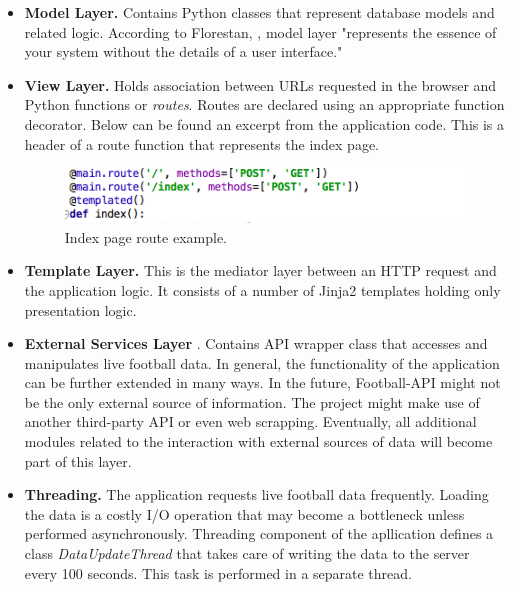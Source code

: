 \begin{itemize}
    \item \textbf{Model Layer.} Contains Python classes that represent database models and related logic. According to Florestan, \cite{article:goodArchitecture}, model layer "represents the essence of your system without the details of a user interface."
    \item \textbf{View Layer.} Holds association between URLs requested in the browser and Python functions or \emph{routes}. Routes are declared using an appropriate function decorator. Below can be found an excerpt from the application code. This is a header of a route function that represents the index page.

\begin{figure}[H]
    \begin{center}
        \includegraphics[width=.50\linewidth,natwidth=610,natheight=642]{impl/images/indexPageRoute}
        \caption{Index page route example.} \label{fig:using:indexPageRoute}
    \end{center}
\end{figure}     
        
    \item \textbf{Template Layer.} This is the mediator layer between an HTTP request and the application logic. It consists of a number of Jinja2 templates holding only     presentation logic. 
    \item \textbf{External Services Layer} \cite{article:goodArchitecture}. Contains API wrapper class that accesses and manipulates live football data. In general, the functionality of the application can be further extended in many ways. In the future, Football-API might not be the only external source of information. The project might make use of another third-party API or even web scrapping. Eventually, all additional modules related to the interaction with external sources of data will become part of this layer.
    \item \textbf{Threading.} The application requests live football data frequently. Loading the data is a costly I/O operation that may become a bottleneck unless performed asynchronously. Threading component of the apllication defines a class \emph{DataUpdateThread} that takes care of writing the data to the server every 100 seconds. This task is performed in a separate thread. 
\end{itemize}

